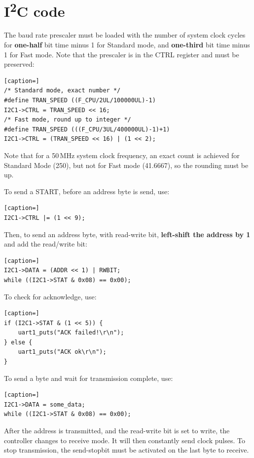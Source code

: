 \documentclass[12pt]{article}
\begin{document}
\section{I\textsuperscript{2}C code}
The baud rate prescaler must be loaded with the number of system clock cycles for \textbf{one-half} bit time minus 1 for Standard mode, and \textbf{one-third} bit time minus 1 for Fast mode. Note that the prescaler is in the CTRL register and must be preserved:

\begin{lstlisting}[caption=]
/* Standard mode, exact number */
#define TRAN_SPEED ((F_CPU/2UL/100000UL)-1)
I2C1->CTRL = TRAN_SPEED << 16;
/* Fast mode, round up to integer */
#define TRAN_SPEED (((F_CPU/3UL/400000UL)-1)+1)
I2C1->CTRL = (TRAN_SPEED << 16) | (1 << 2);
\end{lstlisting} 

Note that for a 50\,MHz system clock frequency, an exact count is achieved for Standard Mode (250), but not for Fast mode (41.6667), so the rounding must be up.

To send a START, before an address byte is send, use:

\begin{lstlisting}[caption=]
I2C1->CTRL |= (1 << 9);
\end{lstlisting} 

Then, to send an address byte, with read-write bit, \textbf{left-shift the address by 1} and add the read/write bit:

\begin{lstlisting}[caption=]
I2C1->DATA = (ADDR << 1) | RWBIT;
while ((I2C1->STAT & 0x08) == 0x00);
\end{lstlisting} 

To check for acknowledge, use:

\begin{lstlisting}[caption=]
if (I2C1->STAT & (1 << 5)) {
    uart1_puts("ACK failed!\r\n");
} else {
    uart1_puts("ACK ok\r\n");
}
\end{lstlisting} 

To send a byte and wait for transmission complete, use:

\begin{lstlisting}[caption=]
I2C1->DATA = some_data;
while ((I2C1->STAT & 0x08) == 0x00);
\end{lstlisting} 

After the address is transmitted, and the read-write bit is set to write, the controller changes to receive mode. It will then constantly send clock pulses. To stop transmission, the send-stopbit must be activated on the last byte to receive.
\end{document}
